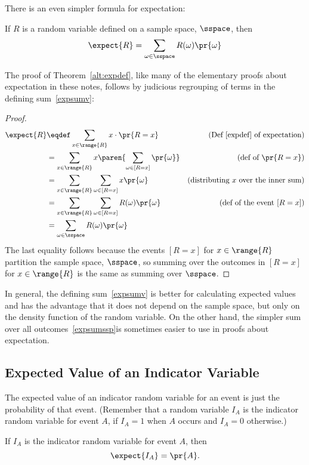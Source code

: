 There is an even simpler formula for expectation:
\begin{theorem}\label{alt:expdef}
If $R$ is a random variable defined on a sample space, $\sspace$, then
\begin{equation}\label{expsumssp}
\expect{R} = \sum_{\omega \in \sspace} R(\omega) \pr{\omega}
\end{equation}
\end{theorem}
The proof of Theorem~\ref{alt:expdef}, like many of the elementary proofs
about expectation in these notes, follows by judicious regrouping of terms
in the defining sum~\eqref{expsumv}:
\begin{proof}
\begin{align*}
\expect{R}
    & \eqdef \sum_{x \in \range{R}} x \cdot \pr{R = x} 
                           &\text{(Def~\ref{expdef} of expectation)}\\
    & = \sum_{x \in \range{R}} x \paren{\sum_{\omega \in [R=x]} \pr{\omega}}
              & \text{(def of $\pr{R=x}$)}\\
    & = \sum_{x \in \range{R}} \sum_{\omega \in [R=x]} x \pr{\omega}
             & \text{(distributing $x$ over the inner sum)} \\    
    & = \sum_{x \in \range{R}} \sum_{\omega \in [R=x]} R(\omega) \pr{\omega} 
                &\text{(def of the event $[R=x]$)}\\
    & = \sum_{\omega \in \sspace} R(\omega) \pr{\omega}
\end{align*}
The last equality follows because the events $[R=x]$ for $x \in \range{R}$
partition the sample space, $\sspace$, so summing over the outcomes in
$[R=x]$ for $x \in \range{R}$ is the same as summing over $\sspace$.
\end{proof}

In general, the defining sum~\eqref{expsumv} is better for calculating
expected values and has the advantage that it does not depend on the
sample space, but only on the density function of the random variable.  On
the other hand, the simpler sum over all outcomes~\eqref{expsumssp}is
sometimes easier to use in proofs about expectation.

\subsection{Expected Value of an Indicator Variable}

The expected value of an indicator random variable for an event is
just the probability of that event.  (Remember that a random variable
$I_A$ is the indicator random variable for event $A$, if $I_A = 1$
when $A$ occurs and $I_A= 0$ otherwise.)
\begin{lemma}\label{expindic}
If $I_A$ is the indicator random variable for event $A$, then
\[
\expect{I_A} = \pr{A}.
\]
\end{lemma}

